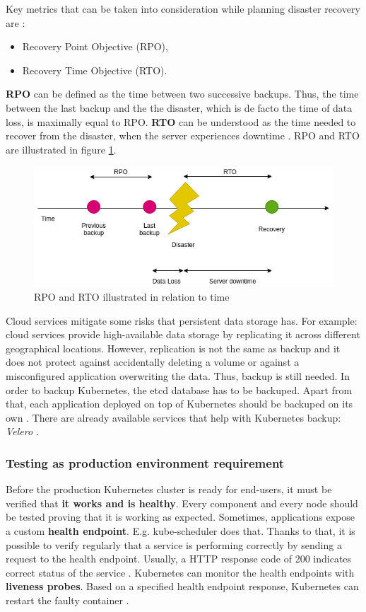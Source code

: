 Key metrics that can be taken into consideration while planning disaster recovery are \cite{article-dr,article-dr-cloud}:
\begin{itemize}
\item Recovery Point Objective (RPO),
\item Recovery Time Objective (RTO).
\end{itemize}
\textbf{RPO} can be defined as the time between two successive backups. Thus, the time between the last backup and the the disaster, which is de facto the time of data loss, is maximally equal to RPO. \textbf{RTO} can be understood as the time needed to recover from the disaster, when the server experiences downtime \cite{article-dr-cloud}. RPO and RTO are illustrated in figure \ref{fig:rpo-rto}.
\begin{figure}[H]
    \centering
    \includegraphics[width=13cm]{figures/rpo-rto.png}
    \caption{RPO and RTO illustrated in relation to time}
    \label{fig:rpo-rto}
\end{figure}

Cloud services mitigate some risks that persistent data storage has. For example: cloud services provide high-available data storage by replicating it across different geographical locations. However, replication is not the same as backup and it does not protect against accidentally deleting a volume or against a misconfigured application overwriting the data. Thus, backup is still needed. In order to backup Kubernetes, the etcd database has to be backuped. Apart from that, each application deployed on top of Kubernetes should be backuped on its own \cite{book-cndwk}. There are already available services that help with Kubernetes backup: \textit{Velero} \cite{book-cndwk}.

\subsubsection{Testing as production environment requirement}
Before the production Kubernetes cluster is ready for end-users, it must be verified that \textbf{it works and is healthy}. Every component and every node should be tested proving that it is working as expected. Sometimes, applications expose a custom \textbf{health endpoint}\cite{book-devops-k8s}. E.g. kube-scheduler does that. Thanks to that, it is possible to verify regularly that a service is performing correctly by sending a request to the health endpoint. Usually, a HTTP response code of 200 indicates correct status of the service \cite{online-ms-health}. Kubernetes can monitor the health endpoints with \textbf{liveness probes}. Based on a specified health endpoint response, Kubernetes can restart the faulty container \cite{online-k8s-probes}.

